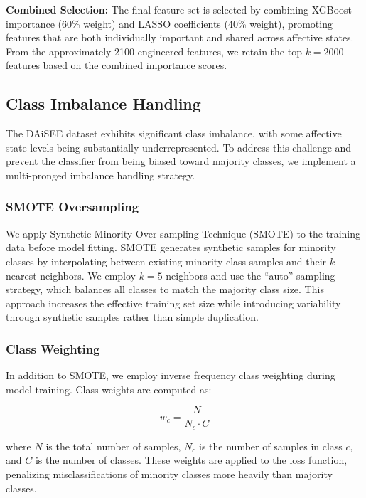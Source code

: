 \documentclass[11pt,a4paper]{article}
\begin{document}
\textbf{Combined Selection:} The final feature set is selected by combining XGBoost importance (60\% weight) and LASSO coefficients (40\% weight), promoting features that are both individually important and shared across affective states. From the approximately 2100 engineered features, we retain the top $k = 2000$ features based on the combined importance scores.


\subsection{Class Imbalance Handling}

The DAiSEE dataset exhibits significant class imbalance, with some affective state levels being substantially underrepresented. To address this challenge and prevent the classifier from being biased toward majority classes, we implement a multi-pronged imbalance handling strategy.

\subsubsection{SMOTE Oversampling}

We apply Synthetic Minority Over-sampling Technique (SMOTE) to the training data before model fitting. SMOTE generates synthetic samples for minority classes by interpolating between existing minority class samples and their $k$-nearest neighbors. We employ $k = 5$ neighbors and use the ``auto'' sampling strategy, which balances all classes to match the majority class size. This approach increases the effective training set size while introducing variability through synthetic samples rather than simple duplication.

\subsubsection{Class Weighting}

In addition to SMOTE, we employ inverse frequency class weighting during model training. Class weights are computed as:

\begin{equation}
w_c = \frac{N}{N_c \cdot C}
\end{equation}

where $N$ is the total number of samples, $N_c$ is the number of samples in class $c$, and $C$ is the number of classes. These weights are applied to the loss function, penalizing misclassifications of minority classes more heavily than majority classes.
\end{document}
